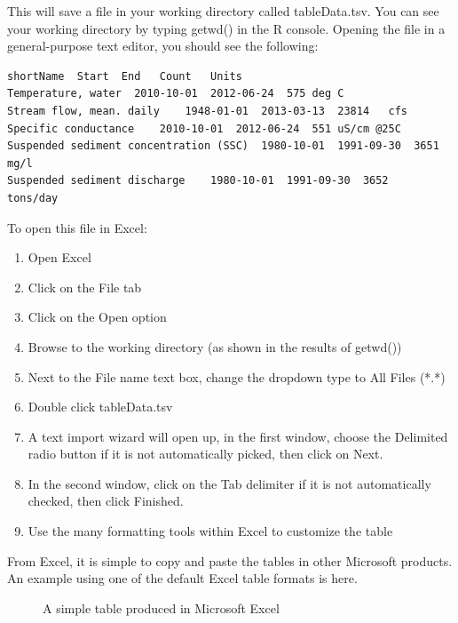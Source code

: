\documentclass[a4paper,11pt]{article}\usepackage[]{graphicx}\usepackage[]{color}
\begin{document}
This will save a file in your working directory called tableData.tsv.  You can see your working directory by typing getwd() in the R console. Opening the file in a general-purpose text editor, you should see the following:

\begin{verbatim}
shortName  Start  End	Count	Units
Temperature, water	2010-10-01	2012-06-24	575	deg C
Stream flow, mean. daily	1948-01-01	2013-03-13	23814	cfs
Specific conductance	2010-10-01	2012-06-24	551	uS/cm @25C
Suspended sediment concentration (SSC)	1980-10-01	1991-09-30	3651	mg/l
Suspended sediment discharge	1980-10-01	1991-09-30	3652	tons/day
\end{verbatim}

To open this file in Excel:
\begin{enumerate}
\item Open Excel
\item Click on the File tab
\item Click on the Open option
\item Browse to the working directory (as shown in the results of getwd())
\item Next to the File name text box, change the dropdown type to All Files (*.*)
\item Double click tableData.tsv
\item A text import wizard will open up, in the first window, choose the Delimited radio button if it is not automatically picked, then click on Next.
\item In the second window, click on the Tab delimiter if it is not automatically checked, then click Finished.
\item Use the many formatting tools within Excel to customize the table
\end{enumerate}

From Excel, it is simple to copy and paste the tables in other Microsoft products. An example using one of the default Excel table formats is here.

\begin{figure}[ht!]
\centering
\caption{A simple table produced in Microsoft Excel}
\label{overflow}
\end{figure}
\end{document}
